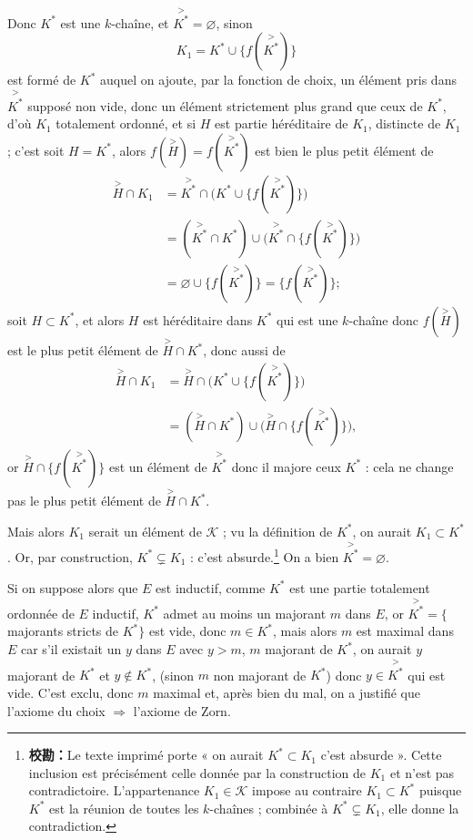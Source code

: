 Donc $K^*$ est une $k$-chaîne, et $\overset{>}{K^*}=\varnothing$, sinon
\[
K_1=K^*\cup\{f(\overset{>}{K^*})\}
\]
est formé de $K^*$ auquel on ajoute, par la fonction de choix, un élément pris dans $\overset{>}{K^*}$ supposé non vide, donc un élément strictement plus grand que ceux de $K^*$, d'où $K_1$ totalement ordonné, et si $H$ est partie héréditaire de $K_1$, distincte de $K_1$ ; c'est soit $H=K^*$, alors $f(\overset{>}{H})=f(\overset{>}{K^*})$ est bien le plus petit élément de
\begin{align*}
\overset{>}{H}\cap K_1
&=\overset{>}{K^*}\cap\bigl(K^*\cup\{f(\overset{>}{K^*})\}\bigr)\\
&=(\overset{>}{K^*}\cap K^*)\cup\bigl(\overset{>}{K^*}\cap\{f(\overset{>}{K^*})\}\bigr)\\
&=\varnothing\cup\{f(\overset{>}{K^*})\}=\{f(\overset{>}{K^*})\};
\end{align*}
soit $H\subset K^*$, et alors $H$ est héréditaire dans $K^*$ qui est une $k$-chaîne donc $f(\overset{>}{H})$ est le plus petit élément de $\overset{>}{H}\cap K^*$, donc aussi de
\begin{align*}
\overset{>}{H}\cap K_1
&=\overset{>}{H}\cap\bigl(K^*\cup\{f(\overset{>}{K^*})\}\bigr)\\
&=(\overset{>}{H}\cap K^*)\cup\bigl(\overset{>}{H}\cap\{f(\overset{>}{K^*})\}\bigr),
\end{align*}
or $\overset{>}{H}\cap\{f(\overset{>}{K^*})\}$ est un élément de $\overset{>}{K^*}$ donc il majore ceux $K^*$ : cela ne change pas le plus petit élément de $\overset{>}{H}\cap K^*$.

Mais alors $K_1$ serait un élément de $\mathcal K$ ; vu la définition de $K^*$, on aurait $K_1\subset K^*$. Or, par construction, $K^*\subsetneq K_1$ : c'est absurde.\footnote{\textbf{校勘：}Le texte imprimé porte « on aurait $K^*\subset K_1$ c'est absurde ». Cette inclusion est précisément celle donnée par la construction de $K_1$ et n'est pas contradictoire. L'appartenance $K_1\in\mathcal K$ impose au contraire $K_1\subset K^*$ puisque $K^*$ est la réunion de toutes les $k$-chaînes ; combinée à $K^*\subsetneq K_1$, elle donne la contradiction.} On a bien $\overset{>}{K^*}=\varnothing$.

Si on suppose alors que $E$ est inductif, comme $K^*$ est une partie totalement ordonnée de $E$ inductif, $K^*$ admet au moins un majorant $m$ dans $E$, or $\overset{>}{K^*}=\{$majorants stricts de $K^*\}$ est vide, donc $m\in K^*$, mais alors $m$ est maximal dans $E$ car s'il existait un $y$ dans $E$ avec $y>m$, $m$ majorant de $K^*$, on aurait $y$ majorant de $K^*$ et $y\notin K^*$, (sinon $m$ non majorant de $K^*$) donc $y\in\overset{>}{K^*}$ qui est vide. C'est exclu, donc $m$ maximal et, après bien du mal, on a justifié que l'axiome du choix $\Rightarrow$ l'axiome de Zorn.

